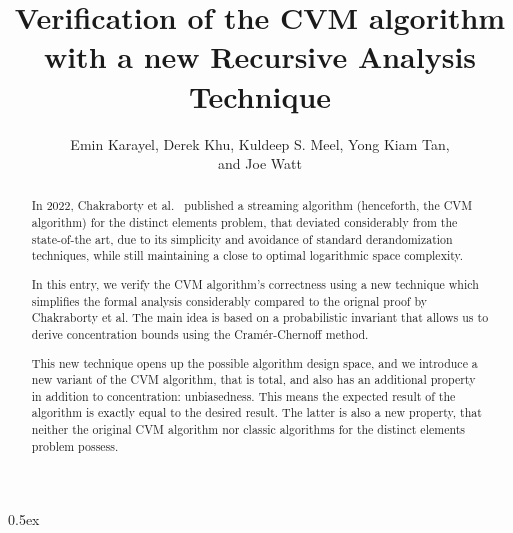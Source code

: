 \documentclass[11pt,a4paper]{article}
\theoremstyle{definition}
\begin{document}
\title{Verification of the CVM algorithm with a new Recursive Analysis Technique}
\author{Emin Karayel, Derek Khu, Kuldeep S. Meel, Yong Kiam Tan,\\and Joe Watt}
\maketitle

\begin{abstract}
In 2022, Chakraborty et al.~\cite{chakraborty2022} published a streaming
algorithm (henceforth, the CVM algorithm) for the distinct
elements problem, that deviated considerably from the state-of-the art, due to its simplicity
and avoidance of standard derandomization techniques, while still maintaining a close to optimal
logarithmic space complexity.

In this entry, we verify the CVM algorithm's correctness using a new technique which simplifies
the formal analysis considerably compared to the orignal proof by Chakraborty et
al. The main idea is based on a probabilistic invariant that allows us to derive concentration bounds
using the Cram\'{e}r-Chernoff method.

This new technique opens up the possible algorithm design space, and we introduce a new variant of the
CVM algorithm, that is total, and also has an additional property in addition
to concentration: unbiasedness. This means the expected result of the algorithm is exactly equal to
the desired result. The latter is also a new property, that neither the original CVM algorithm
nor classic algorithms for the distinct elements problem possess.
\end{abstract}

\tableofcontents

\parindent 0pt\parskip 0.5ex






\appendix

\end{document}

